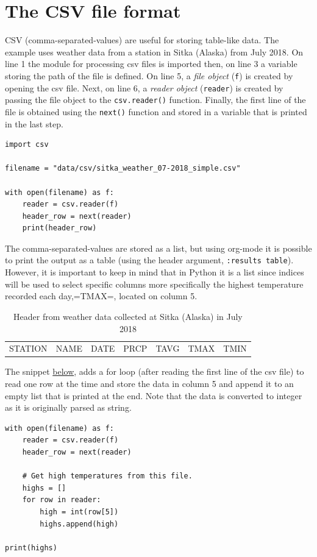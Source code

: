 \documentclass[10pt]{book}
\begin{document}
\section{The CSV file format}
\label{sec:orgd49a017}
CSV  (comma-separated-values) are useful for storing table-like data. The example uses weather data from a station in Sitka (Alaska) from July 2018. On line 1 the module for processing csv files is imported then, on line 3 a variable storing the path of the file is defined. On line 5, a \emph{file object} (\texttt{f}) is created by opening the csv file. Next, on line 6, a \emph{reader object} (\texttt{reader}) is created by passing the file object to the \texttt{csv.reader()} function. Finally, the first line of the file is obtained using the \texttt{next()} function and stored in a variable that is printed in the last step.

\label{orgb64852b}
\begin{verbatim}
import csv

filename = "data/csv/sitka_weather_07-2018_simple.csv"

with open(filename) as f:
    reader = csv.reader(f)
    header_row = next(reader)
    print(header_row)
\end{verbatim}

The comma-separated-values are stored as a list, but using org-mode it is possible to print the output as a table (using the header argument, \texttt{:results table}). However, it is important to keep in mind that in Python it is a list since indices will be used to select specific columns more specifically the highest temperature recorded each day,=TMAX=, located on column 5.

\begin{table}[htbp]
\caption{\label{tab:orge7c71f3}Header from weather data collected at Sitka (Alaska) in July 2018}
\centering
\begin{tabular}{lllllll}
STATION & NAME & DATE & PRCP & TAVG & TMAX & TMIN\\
\end{tabular}
\end{table}


The snippet \hyperref[orga7be2ee]{below}, adds a for loop (after reading the first line of the csv file) to read one row at the time and store the data in column 5 and append it to an empty list that is printed at the end. Note that the data is converted to integer as it is originally parsed as string.

\label{orga7be2ee}
\begin{verbatim}
with open(filename) as f:
    reader = csv.reader(f)
    header_row = next(reader)

    # Get high temperatures from this file.
    highs = []
    for row in reader:
        high = int(row[5])
        highs.append(high)

print(highs)
\end{verbatim}
\end{document}
